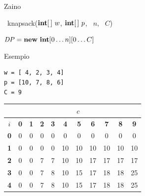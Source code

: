 \begin{frame}{Zaino}

\vspace{-9pt}
\begin{Procedure}
\caption[A]{\INTEGER\ \textsf{knapsack}($\INTEGER[\,]\ w$, $\INTEGER[\,]\ p$, \INTEGER\ $n$, \INTEGER\ $C$)}

$\mathit{DP} = \NEW\ \INTEGER[0 \ldots n][0 \ldots C]$\;
\;
\end{Procedure}

\end{frame}


\begin{frame}[fragile]{Esempio}

\vspace{-18pt}
\begin{lstlisting}
w = [ 4, 2, 3, 4]
p = [10, 7, 8, 6]
C = 9  
\end{lstlisting}

\bigskip
\begin{tabular}{|c|c|c|c|c|c|c|c|c|c|c|}
\hline
& \multicolumn{10}{c|}{$c$} \\\hline
$i$ & \textbf{0} & \textbf{1} & \textbf{2} & \textbf{3} & \textbf{4} & \textbf{5} & \textbf{6} & \textbf{7} & \textbf{8} & \textbf{9}  \\\hline
\textbf{0} & 0 &  0 &  0 &  0 &  0 &  0 &  0 &  0 &  0 &  0 \\\hline
\textbf{1} & 0 &  0 &  0 &  0 & 10 & 10 & 10 & 10 & 10 & 10 \\\hline
\textbf{2} & 0 &  0 &  7 &  7 & 10 & 10 & 17 & 17 & 17 & 17 \\\hline
\textbf{3} & 0 &  0 &  7 &  8 & 10 & 15 & 17 & 18 & 18 & 25 \\\hline
\textbf{4} & 0 &  0 &  7 &  8 & 10 & 15 & 17 & 18 & 18 & 25 \\\hline  
\end{tabular}  

\end{frame}

